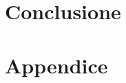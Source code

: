 \documentclass[target=bach,aauheader=,style=]{thud}
\begin{document}
\chapter{Conclusione}



\appendix


\chapter{Appendice}


\backmatter





\end{document}
